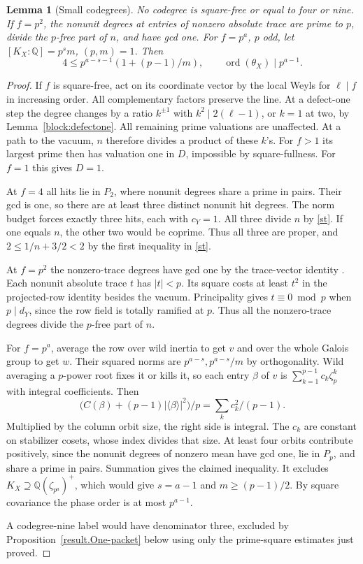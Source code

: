 \documentclass[11pt]{amsart}
\numberwithin{equation}{section}
\newtheorem{lemma}[theorem]{Lemma}
\theoremstyle{definition}
\theoremstyle{plain}
\newcommand{\QQ}{\mathbb Q}
\begin{document}
\begin{lemma}[Small codegrees]\label{small}
No codegree is square-free or equal to four or nine. If $f=p^2$,
the nonunit degrees at entries of nonzero absolute trace are prime
to $p$, divide the $p$-free part of $n$, and have gcd one.
For $f=p^a$, $p$ odd, let $[K_X:\QQ]=p^sm$, $(p,m)=1$. Then
\[
 4\le p^{a-s-1}(1+(p-1)/m),\qquad
 \operatorname{ord}(\theta_X)\mid p^{a-1}.
\]
\end{lemma}
\begin{proof}
If $f$ is square-free, act on its coordinate vector by the local
Weyls for $\ell\mid f$ in increasing order. All complementary
factors preserve the line. At a defect-one step the degree changes
by a ratio $k^{\pm1}$ with $k^2\mid2(\ell-1)$, or $k=1$ at two,
by Lemma~\ref{block:defectone}. All remaining prime valuations are
unaffected. At a path to the vacuum, $n$ therefore divides a product
of these $k$'s. For $f>1$ its largest prime then has valuation one
in $D$, impossible by square-fullness. For $f=1$ this gives $D=1$.

At $f=4$ all hits lie in $P_2$, where nonunit degrees share a prime
in pairs. Their gcd is one, so there are at least three distinct
nonunit hit degrees. The norm budget forces exactly three hits,
each with $c_Y=1$. All three divide $n$ by \eqref{st}. If one
equals $n$, the other two would be coprime. Thus all three are
proper, and $2\le1/n+3/2<2$ by the first inequality in \eqref{st}.

At $f=p^2$ the nonzero-trace degrees have gcd one by the
trace-vector identity \cite[Proposition~5.4]{BDPcore}. Each
nonunit absolute trace $t$ has $|t|<p$. Its square costs at least
$t^2$ in the projected-row identity \cite[(2.4)]{BDPcore} besides
the vacuum. Principality gives $t\equiv0\bmod p$ when $p\mid d_Y$,
since the row field is totally ramified at $p$. Thus all the
nonzero-trace degrees divide the $p$-free part of $n$.

For $f=p^a$, average the row over wild inertia to get $v$ and
over the whole Galois group to get $w$. Their squared norms are
$p^{a-s},p^{a-s}/m$ by orthogonality. Wild averaging a $p$-power
root fixes it or kills it, so each entry $\beta$ of $v$ is
$\sum_{k=1}^{p-1}c_k\zeta_p^k$ with integral coefficients. Then
\[
 \bigl(C(\beta)+(p-1)|\langle\beta\rangle|^2\bigr)/p
       =\sum_k c_k^2/(p-1).
\]
Multiplied by the column orbit size, the right side is integral.
The $c_k$ are constant on stabilizer cosets, whose index divides
that size. At least four orbits contribute positively, since the
nonunit degrees of nonzero mean have gcd one, lie in $P_p$, and
share a prime in pairs. Summation gives the claimed inequality. It excludes
$K_X\supseteq\QQ(\zeta_{p^a})^+$, which would give $s=a-1$ and
$m\ge(p-1)/2$. By square covariance the phase order is at most
$p^{a-1}$.

A codegree-nine label would have denominator three, excluded
by Proposition~\ref{result.One-packet} below using only the prime-square
estimates just proved.
\end{proof}
\end{document}
